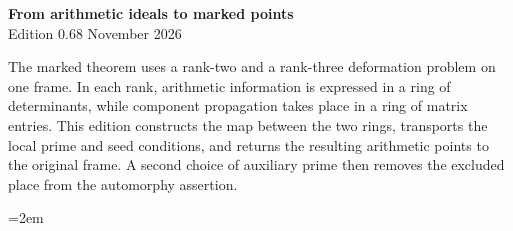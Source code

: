 \begin{center}
{\Large\bfseries From arithmetic ideals to marked points}\\[4pt]
Edition 0.68  November 2026
\end{center}

The marked theorem uses a rank-two and a rank-three deformation
problem on one frame. In each rank, arithmetic information is
expressed in a ring of determinants, while component propagation
takes place in a ring of matrix entries. This edition constructs
the map between the two rings, transports the local prime and seed
conditions, and returns the resulting arithmetic points to the
original frame. A second choice of auxiliary prime then removes the
excluded place from the automorphy assertion.

\begingroup\emergencystretch=2em




\endgroup
